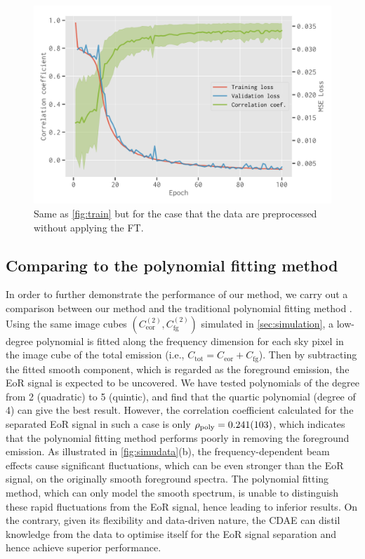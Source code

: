 \documentclass[fleqn,usenatbib]{mnras}
\newlength{\myfigwidth}
\newcommand{\R}[1]{\mathrm{#1}}
\newcommand{\editwip}[1]{{\leavevmode\color{magenta}#1}}
\begin{document}
\begin{figure}
  \centering
  \includegraphics[width=\myfigwidth]{cdae-train-noft}
  \caption{\label{fig:train-noft}%
    Same as \autoref{fig:train} but for the case that the data are
    preprocessed without applying the FT.
  }
\end{figure}


\subsection{Comparing to the polynomial fitting method}
\label{sec:polyfit}

In order to further demonstrate the performance of our method, we carry
out a comparison between our method and the traditional polynomial
fitting method \citep[e.g.,][]{wang2006,liu2009ps}.
Using the same image cubes
\editwip{$\left( C_{\R{eor}}^{(2)}, C_{\R{fg}}^{(2)} \right)$}
simulated in \autoref{sec:simulation},
a low-degree polynomial is fitted along the frequency dimension for each
sky pixel in the image cube of the total emission (i.e.,
$C_{\R{tot}} = C_{\R{eor}} + C_{\R{fg}}$).
Then by subtracting the fitted smooth component, which is regarded as
the foreground emission, the EoR signal is expected to be uncovered.
We have tested polynomials of the degree from 2 (quadratic) to
5 (quintic), and find that the quartic polynomial (degree of 4)
can give the best result.
However, the correlation coefficient calculated for the separated EoR
signal in such a case is only $\rho_{\R{poly}} = \num{0.241 +- 0.103}$,
which indicates that the polynomial fitting method
performs poorly in removing the foreground emission.
As illustrated in \autoref{fig:simudata}(b), the frequency-dependent
beam effects cause significant fluctuations, which can be even stronger
than the EoR signal, on the originally smooth foreground spectra.
The polynomial fitting method, which can only model the smooth
spectrum, is unable to distinguish these rapid fluctuations from the
EoR signal, hence leading to inferior results.
On the contrary, given its flexibility and data-driven nature,
the CDAE can distil knowledge from the data to optimise itself for
the EoR signal separation and hence achieve superior performance.
\end{document}
